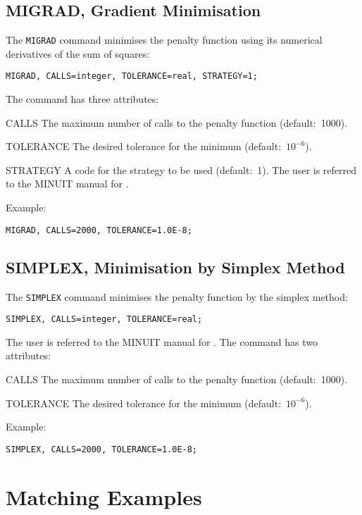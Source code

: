 \subsection{MIGRAD, Gradient Minimisation}
The \texttt{MIGRAD} command minimises the penalty
function using its numerical derivatives of the sum of squares:
\begin{verbatim}
MIGRAD, CALLS=integer, TOLERANCE=real, STRATEGY=1;
\end{verbatim}
The command has three attributes:
\begin{kdescription}
\item[CALLS]
  The maximum number of calls to the penalty function (default:~1000).
\item[TOLERANCE]
  The desired tolerance for the minimum (default:~\(10^{-6}\)).
\item[STRATEGY]
  A code for the strategy to be used (default:~1).
  The user is referred to the MINUIT manual for
  .
\end{kdescription}
Example:
\begin{verbatim}
MIGRAD, CALLS=2000, TOLERANCE=1.0E-8;
\end{verbatim}

\subsection{SIMPLEX, Minimisation by Simplex Method}
The \texttt{SIMPLEX} command minimises the penalty
function by the simplex method:
\begin{verbatim}
SIMPLEX, CALLS=integer, TOLERANCE=real;
\end{verbatim}
The user is referred to the MINUIT manual for
.
The command has two attributes:
\begin{kdescription}
\item[CALLS]
  The maximum number of calls to the penalty function (default:~1000).
\item[TOLERANCE]
  The desired tolerance for the minimum (default:~\(10^{-6}\)).
\end{kdescription}
Example:
\begin{verbatim}
SIMPLEX, CALLS=2000, TOLERANCE=1.0E-8;
\end{verbatim}

\section{Matching Examples}

